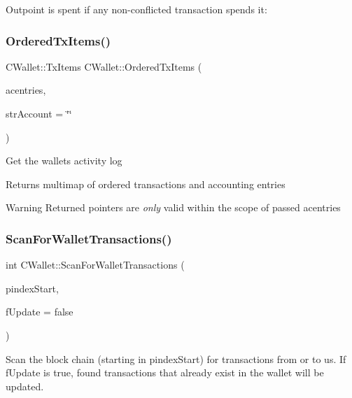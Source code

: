 Outpoint is spent if any non-\/conflicted transaction spends it\+: \mbox{\label{group__map_wallet_ga740572131004d77fbdb4617ec1aafb4a}} 
\subsubsection{\texorpdfstring{OrderedTxItems()}{OrderedTxItems()}}
{\footnotesize\ttfamily C\+Wallet\+::\+Tx\+Items C\+Wallet\+::\+Ordered\+Tx\+Items (\begin{DoxyParamCaption}\item[{std\+::list$<$ \mbox{\hyperlink{class_c_accounting_entry}{C\+Accounting\+Entry}} $>$ \&}]{acentries,  }\item[{std\+::string}]{str\+Account = {\ttfamily \char`\"{}\char`\"{}} }\end{DoxyParamCaption})}

Get the wallet\textquotesingle{}s activity log \begin{DoxyReturn}{Returns}
multimap of ordered transactions and accounting entries 
\end{DoxyReturn}
\begin{DoxyWarning}{Warning}
Returned pointers are {\itshape only} valid within the scope of passed acentries 
\end{DoxyWarning}
\mbox{\label{group__map_wallet_ga979a17e80e4897ed1f4ae9a4be7c493c}} 
\subsubsection{\texorpdfstring{ScanForWalletTransactions()}{ScanForWalletTransactions()}}
{\footnotesize\ttfamily int C\+Wallet\+::\+Scan\+For\+Wallet\+Transactions (\begin{DoxyParamCaption}\item[{\mbox{\hyperlink{class_c_block_index}{C\+Block\+Index}} $\ast$}]{pindex\+Start,  }\item[{bool}]{f\+Update = {\ttfamily false} }\end{DoxyParamCaption})}

Scan the block chain (starting in pindex\+Start) for transactions from or to us. If f\+Update is true, found transactions that already exist in the wallet will be updated. 